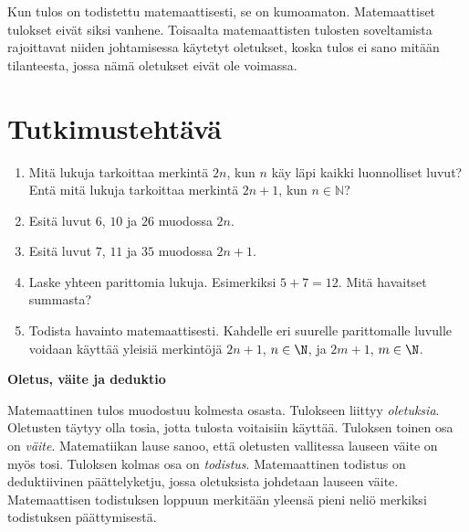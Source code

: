 Kun tulos on todistettu matemaattisesti, se on kumoamaton. Matemaattiset tulokset eivät siksi vanhene. Toisaalta matemaattisten tulosten soveltamista rajoittavat niiden johtamisessa käytetyt oletukset, koska tulos ei sano mitään tilanteesta, jossa nämä oletukset eivät ole voimassa.

\section*{Tutkimustehtävä}
\begin{enumerate}
\item Mitä lukuja tarkoittaa merkintä $2n$, kun $n$ käy läpi kaikki luonnolliset luvut? Entä mitä lukuja tarkoittaa merkintä $2n + 1$, kun $n\in \mathbb{N}$?
\item %
Esitä luvut $6$, $10$ ja $26$ muodossa $2n$.
\item %
Esitä luvut $7$, $11$ ja $35$ muodossa $2n+1$.
\item Laske yhteen parittomia lukuja. Esimerkiksi $5 + 7 = 12$. Mitä havaitset summasta?
\item Todista havainto matemaattisesti. Kahdelle eri suurelle parittomalle luvulle voidaan käyttää yleisiä merkintöjä $2n + 1$, $n \in\N$, ja $2m + 1$, $m \in\N$.
\end{enumerate}


{\bf Oletus, väite ja deduktio}

Matemaattinen tulos muodostuu kolmesta osasta. Tulokseen liittyy {\em oletuksia}. Oletusten täytyy olla tosia, jotta tulosta voitaisiin käyttää. Tuloksen toinen osa on {\em väite}. Matematiikan lause sanoo, että oletusten vallitessa lauseen väite on myös tosi. Tuloksen kolmas osa on {\em todistus}. Matemaattinen todistus on deduktiivinen päättelyketju, jossa oletuksista johdetaan lauseen väite. Matemaattisen todistuksen loppuun merkitään yleensä pieni neliö merkiksi todistuksen päättymisestä.

